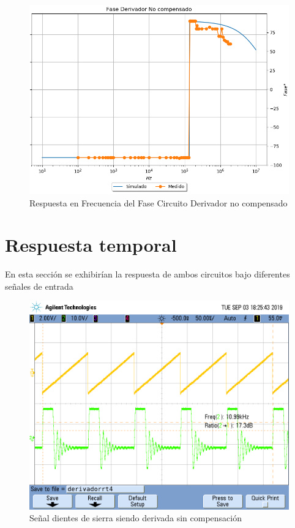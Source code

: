\begin{figure}[H]
	\centering
	\includegraphics[width=\textwidth]{Ejercicio4/SUPERPOSICION-FASE-DERIVADOR-NO-COMPENSADO}
	\caption{Respuesta en Frecuencia del Fase Circuito Derivador no compensado}
\end{figure}

\section{Respuesta temporal}
En esta sección se exhibirían la respuesta de ambos circuitos bajo diferentes señales de entrada



\begin{figure}[H]
	\centering
	\includegraphics[width=\textwidth]{Ejercicio4/FOTOS-TP2-TC-EJ4/derivadorrt4}
	\caption{Señal dientes de sierra siendo derivada sin compensación}
\end{figure}

